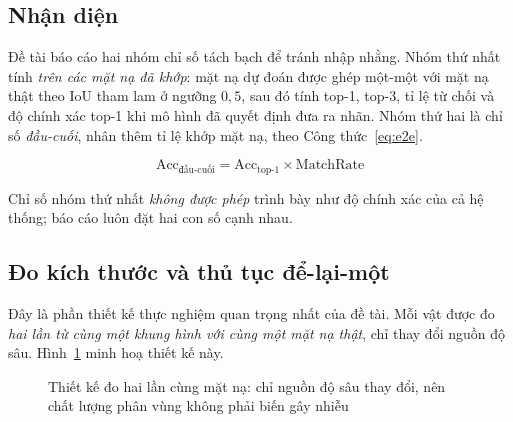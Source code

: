 \subsection{Nhận diện}

Đề tài báo cáo hai nhóm chỉ số tách bạch để tránh nhập nhằng. Nhóm thứ nhất tính \emph{trên các
mặt nạ đã khớp}: mặt nạ dự đoán được ghép một-một với mặt nạ thật theo IoU tham lam ở ngưỡng
$0{,}5$, sau đó tính top-1, top-3, tỉ lệ từ chối và độ chính xác top-1 khi mô hình đã quyết định
đưa ra nhãn. Nhóm thứ hai là chỉ số \emph{đầu-cuối}, nhân thêm tỉ lệ khớp mặt nạ, theo
Công thức~\eqref{eq:e2e}.

\begin{equation}
\label{eq:e2e}
\mathrm{Acc}_{\text{đầu-cuối}} = \mathrm{Acc}_{\text{top-1}} \times \mathrm{MatchRate}
\end{equation}

Chỉ số nhóm thứ nhất \emph{không được phép} trình bày như độ chính xác của cả hệ thống; báo cáo
luôn đặt hai con số cạnh nhau.

\subsection{Đo kích thước và thủ tục để-lại-một}
\label{sec:loo}

Đây là phần thiết kế thực nghiệm quan trọng nhất của đề tài. Mỗi vật được đo \emph{hai lần từ
cùng một khung hình với cùng một mặt nạ thật}, chỉ thay đổi nguồn độ sâu. Hình~\ref{fig:loo}
minh hoạ thiết kế này.

\begin{figure}[H]
\centering
{}
\caption{Thiết kế đo hai lần cùng mặt nạ: chỉ nguồn độ sâu thay đổi, nên chất lượng phân vùng
không phải biến gây nhiễu}
\label{fig:loo}
\end{figure}

